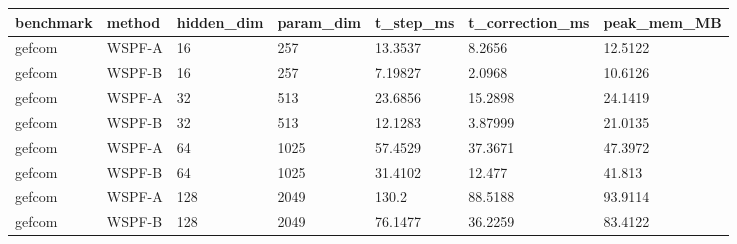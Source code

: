 \begin{tabular}{lllllll}
\hline
benchmark & method & hidden\_dim & param\_dim & t\_step\_ms & t\_correction\_ms & peak\_mem\_MB \\
\hline
gefcom & WSPF-A & 16 & 257 & 13.3537 & 8.2656 & 12.5122 \\
gefcom & WSPF-B & 16 & 257 & 7.19827 & 2.0968 & 10.6126 \\
gefcom & WSPF-A & 32 & 513 & 23.6856 & 15.2898 & 24.1419 \\
gefcom & WSPF-B & 32 & 513 & 12.1283 & 3.87999 & 21.0135 \\
gefcom & WSPF-A & 64 & 1025 & 57.4529 & 37.3671 & 47.3972 \\
gefcom & WSPF-B & 64 & 1025 & 31.4102 & 12.477 & 41.813 \\
gefcom & WSPF-A & 128 & 2049 & 130.2 & 88.5188 & 93.9114 \\
gefcom & WSPF-B & 128 & 2049 & 76.1477 & 36.2259 & 83.4122 \\
\hline
\end{tabular}
